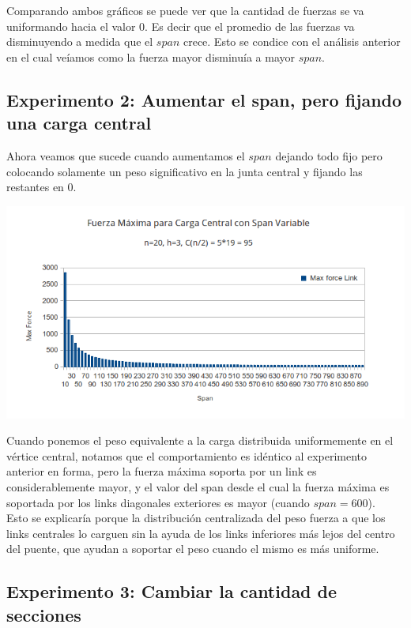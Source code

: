 Comparando ambos gráficos se puede ver que la cantidad de fuerzas se va uniformando hacia el valor $0$. Es decir que el promedio de las fuerzas va disminuyendo a medida que el $span$ crece. Esto se condice con el análisis anterior en el cual veíamos como la fuerza mayor disminuía a mayor $span$.

\subsection{Experimento 2: Aumentar el span, pero fijando una carga central}

Ahora veamos que sucede cuando aumentamos el $span$ dejando todo fijo pero colocando solamente un peso significativo en la junta central y fijando las restantes en $0$.

\begin{center}
\includegraphics[scale=0.8]{archivos/graficos/Fuerza-x-span-peso-central.png}\\
\end{center}

Cuando ponemos el peso equivalente a la carga distribuida uniformemente en el vértice central, notamos que el comportamiento es idéntico al experimento anterior en forma, pero la fuerza máxima soporta por un link es considerablemente mayor, y el valor del span desde el cual la fuerza máxima es soportada por los links diagonales exteriores es mayor (cuando $span = 600$).\\

Esto se explicaría porque la distribución centralizada del peso fuerza a que los links centrales lo carguen sin la ayuda de los links inferiores más lejos del centro del puente, que ayudan a soportar el peso cuando el mismo es más uniforme.

\subsection{Experimento 3: Cambiar la cantidad de secciones}

